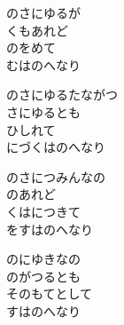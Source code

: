 \documentclass[10pt,b5j]{tarticle} %
\begin{document}
\vspace{1.5em} %
\newcommand{\linespace}{0.5em} %
\newcommand{\blocksize}{0.5\hsize} %
\begin{enumerate} %
    \begin{minipage}[c]{\blocksize}
    
        \vspace{\linespace}
        \item
        のさにゆるが\\
        くもあれど\\
        のをめて\\
        むはのへなり
        
        \vspace{\linespace}
        \item
        のさにゆるたながつ\\
        さにゆるとも\\
        ひしれて\\
        にづくはのへなり
        
        \vspace{\linespace}
        \item
        のさにつみんなの\\
        のあれど\\
        くはにつきて\\
        をすはのへなり
        
        \vspace{\linespace}
        \item
        のにゆきなの\\
        のがつるとも\\
        そのもてとして\\
        すはのへなり
    
    \end{minipage}
\end{enumerate} %
\end{document}
